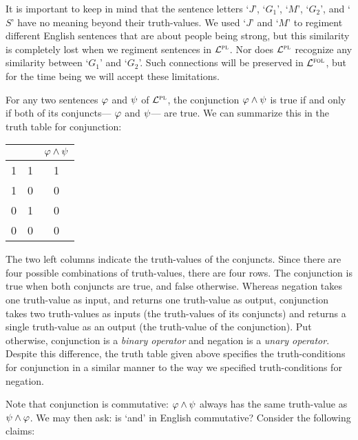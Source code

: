 It is important to keep in mind that the sentence letters `$J$', `$G_{1}$', `$M$', `$G_{2}$', and `$S$' have no meaning beyond their truth-values.
We used `$J$' and `$M$' to regiment different English sentences that are about people being strong, but this similarity is completely lost when we regiment sentences in $\mathcal{L}^{\textsc{pl}}$.
Nor does $\mathcal{L}^{\textsc{pl}}$ recognize any similarity between `$G_{1}$' and `$G_{2}$'.
Such connections will be preserved in $\mathcal{L}^{\textsc{fol}}$, but for the time being we will accept these limitations.

For any two sentences $\varphi$ and $\psi$ of $\mathcal{L}^{\textsc{pl}}$, the conjunction $\varphi \wedge \psi$ is true if and only if both of its conjuncts--- $\varphi$ and $\psi$--- are true.
We can summarize this in the truth table for conjunction:

\begin{center}
\begin{tabular}{c|c|c}
\metaA{} & \metaB{} & $\varphi{} \wedge \psi{}$\\
\hline
1 & 1 & 1\\
1 & 0 & 0\\
0 & 1 & 0\\
0 & 0 & 0
\end{tabular}
\end{center}

The two left columns indicate the truth-values of the conjuncts.
Since there are four possible combinations of truth-values, there are four rows.
The conjunction is true when both conjuncts are true, and false otherwise.
Whereas negation takes one truth-value as input, and returns one truth-value as output, conjunction takes two truth-values as inputs (the truth-values of its conjuncts) and returns a single truth-value as an output (the truth-value of the conjunction). 
Put otherwise, conjunction is a \textit{binary operator} and negation is a \textit{unary operator}.
Despite this difference, the truth table given above specifies the truth-conditions for conjunction in a similar manner to the way we specified truth-conditions for negation.

Note that conjunction is commutative: $\varphi{}\wedge\psi{}$ always has the same truth-value as $\psi{}\wedge\varphi{}$.
We may then ask: is `and' in English commutative?
Consider the following claims:

\begin{earg} \label{order}
\end{earg}

